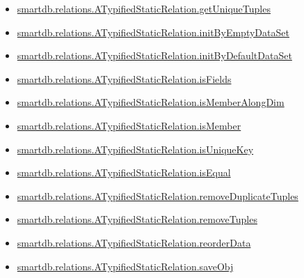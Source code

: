 \documentclass[letterpaper,10pt,english]{sphinxmanual}
\begin{document}
\begin{itemize}
\item {} 
{\hyperref[chap_func:smartdb-relations-atypifiedstaticrelation-getuniquetuples]{smartdb.relations.ATypifiedStaticRelation.getUniqueTuples}}

\item {} 
{\hyperref[chap_func:smartdb-relations-atypifiedstaticrelation-initbyemptydataset]{smartdb.relations.ATypifiedStaticRelation.initByEmptyDataSet}}

\item {} 
{\hyperref[chap_func:smartdb-relations-atypifiedstaticrelation-initbydefaultdataset]{smartdb.relations.ATypifiedStaticRelation.initByDefaultDataSet}}

\item {} 
{\hyperref[chap_func:smartdb-relations-atypifiedstaticrelation-isfields]{smartdb.relations.ATypifiedStaticRelation.isFields}}

\item {} 
{\hyperref[chap_func:smartdb-relations-atypifiedstaticrelation-ismemberalongdim]{smartdb.relations.ATypifiedStaticRelation.isMemberAlongDim}}

\item {} 
{\hyperref[chap_func:smartdb-relations-atypifiedstaticrelation-ismember]{smartdb.relations.ATypifiedStaticRelation.isMember}}

\item {} 
{\hyperref[chap_func:smartdb-relations-atypifiedstaticrelation-isuniquekey]{smartdb.relations.ATypifiedStaticRelation.isUniqueKey}}

\item {} 
{\hyperref[chap_func:smartdb-relations-atypifiedstaticrelation-isequal]{smartdb.relations.ATypifiedStaticRelation.isEqual}}

\item {} 
{\hyperref[chap_func:smartdb-relations-atypifiedstaticrelation-removeduplicatetuples]{smartdb.relations.ATypifiedStaticRelation.removeDuplicateTuples}}

\item {} 
{\hyperref[chap_func:smartdb-relations-atypifiedstaticrelation-removetuples]{smartdb.relations.ATypifiedStaticRelation.removeTuples}}

\item {} 
{\hyperref[chap_func:smartdb-relations-atypifiedstaticrelation-reorderdata]{smartdb.relations.ATypifiedStaticRelation.reorderData}}

\item {} 
{\hyperref[chap_func:smartdb-relations-atypifiedstaticrelation-saveobj]{smartdb.relations.ATypifiedStaticRelation.saveObj}}


\end{itemize}
\end{document}
